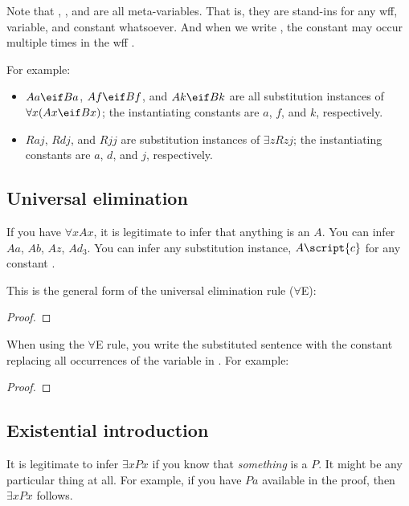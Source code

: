 Note that , , and  are all meta-variables. That is, they are stand-ins for any wff, variable, and constant whatsoever. And when we write , the constant  may occur multiple times in the wff .


For example:

\begin{itemize}
\item $Aa \eif Ba$, $Af \eif Bf$, and $Ak \eif Bk$ are all substitution instances of $\forall x(Ax \eif Bx)$; the instantiating constants are $a$, $f$, and $k$, respectively.
\item $Raj$, $Rdj$, and $Rjj$ are substitution instances of $\exists zRzj$; the instantiating constants are $a$, $d$, and $j$, respectively.
\end{itemize}

\subsection{Universal elimination}

If you have $\forall x Ax$, it is legitimate to infer that anything is an $A$. You can infer $Aa$, $Ab$, $Az$, $Ad_3$. You can infer any substitution instance, $A\script{c}$ for any constant .

This is the general form of the universal elimination rule ($\forall$E):

\begin{proof}
	 
\end{proof}

When using the $\forall$E rule, you write the substituted sentence with the constant  replacing all occurrences of the variable  in . For example:

\begin{proof}
	 
	 
\end{proof}


\subsection{Existential introduction}

It is legitimate to infer $\exists x Px$ if you know that \emph{something} is a $P$. It might be any particular thing at all. For example, if you have $Pa$ available in the proof, then $\exists x Px$ follows. 

